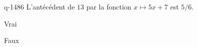 \begin{truefalse}{q-1486}
L'antécédent de $13$ par la fonction $x\mapsto 5x+7$ est $5/6$.
\item Vrai
\item* Faux
\end{truefalse}

